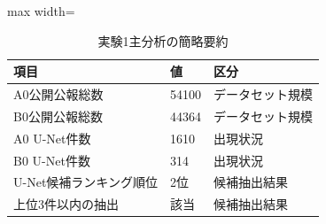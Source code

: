 \begin{table}[tbp]
\centering
\small
\caption{実験1主分析の簡略要約}
\label{tab:experiment1_result_table}
\begin{adjustbox}{max width=\textwidth}
\begin{tabular}{lll}
\toprule
項目 & 値 & 区分 \\
\midrule
A0公開公報総数 & 54100 & データセット規模 \\
B0公開公報総数 & 44364 & データセット規模 \\
A0 U-Net件数 & 1610 & 出現状況 \\
B0 U-Net件数 & 314 & 出現状況 \\
U-Net候補ランキング順位 & 2位 & 候補抽出結果 \\
上位3件以内の抽出 & 該当 & 候補抽出結果 \\
\bottomrule
\end{tabular}
\end{adjustbox}
\end{table}
